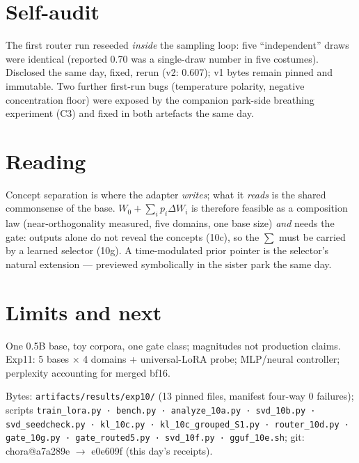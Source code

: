 \documentclass[11pt, a4paper]{article}
\begin{document}
\section{Self-audit}
The first router run reseeded \emph{inside} the sampling loop: five ``independent'' draws
were identical (reported 0.70 was a single-draw number in five costumes). Disclosed the
same day, fixed, rerun (v2: 0.607); v1 bytes remain pinned and immutable. Two further
first-run bugs (temperature polarity, negative concentration floor) were exposed by the
companion park-side breathing experiment (C3) and fixed in both artefacts the same day.

\section{Reading}
Concept separation is where the adapter \emph{writes}; what it \emph{reads} is the shared
commonsense of the base. $W_0+\sum_i p_i\Delta W_i$ is therefore feasible as a
composition law (near-orthogonality measured, five domains, one base size) \emph{and}
needs the gate: outputs alone do not reveal the concepts (10c), so the $\sum$ must be
carried by a learned selector (10g). A time-modulated prior pointer is the selector's
natural extension --- previewed symbolically in the sister park the same day.

\section{Limits and next}
One 0.5B base, toy corpora, one gate class; magnitudes not production claims. Exp11:
5 bases $\times$ 4 domains + universal-LoRA probe; MLP/neural controller; perplexity
accounting for merged bf16.

\vspace{1em}
\footnotesize
Bytes: \texttt{artifacts/results/exp10/} (13 pinned files, manifest four-way 0 failures);
scripts \texttt{train\_lora.py · bench.py · analyze\_10a.py · svd\_10b.py ·
svd\_seedcheck.py · kl\_10c.py · kl\_10c\_grouped{\_S1}.py · router\_10d.py ·
gate\_10g.py · gate\_routed5.py · svd\_10f.py · gguf\_10e.sh};
git: chora@a7a289e \(\to\) e0e609f (this day's receipts).
\end{document}
